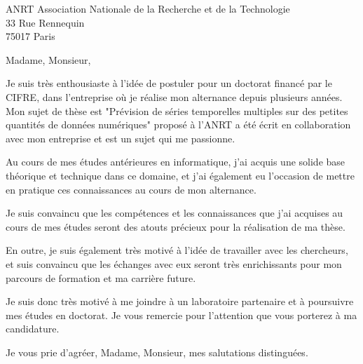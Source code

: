 \documentclass[12pt]{lettre}
\begin{document}

\begin{letter}{ANRT Association Nationale de la Recherche et de la Technologie\\ 33 Rue Rennequin \\75017 Paris}

    \def\concname{Objet :~} %
    \opening{Madame, Monsieur,}

    Je suis très enthousiaste à l'idée de postuler pour un doctorat financé par le CIFRE, dans l'entreprise où je réalise mon alternance depuis plusieurs années.
    Mon sujet de thèse est "Prévision de séries temporelles multiples sur des petites quantités de données numériques" proposé à l'ANRT a été écrit en collaboration avec mon entreprise et est un sujet qui me passionne.

    Au cours de mes études antérieures en informatique, j'ai acquis une solide base théorique et technique dans ce domaine, et j'ai également eu l'occasion de mettre en pratique ces connaissances au cours de mon alternance.

    Je suis convaincu que les compétences et les connaissances que j'ai acquises au cours de mes études seront des atouts précieux pour la réalisation de ma thèse.

    En outre, je suis également très motivé à l'idée de travailler avec les chercheurs, et suis convaincu que les échanges avec eux seront très enrichissants pour mon parcours de formation et ma carrière future.

    Je suis donc très motivé à me joindre à un laboratoire partenaire et à poursuivre mes études en doctorat. Je vous remercie pour l'attention que vous porterez à ma candidature.

    \closing{Je vous prie d'agréer, Madame, Monsieur, mes salutations distinguées.}

\end{letter}
\end{document}
